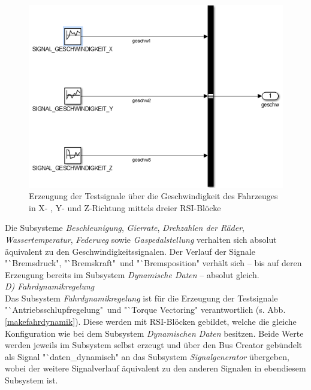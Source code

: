 \documentclass[fontsize = 12pt, paper = a4]{scrreprt}
\begin{document}
\begin{figure}[h]
\centering
\includegraphics[scale = 0.85]{makegeschwindigkeit}
\caption[Generierung der Testsignale für die Geschwindigkeit des Fahrzeuges]{Erzeugung der Testsignale über die Geschwindigkeit des Fahrzeuges in X- , Y- und Z-Richtung mittels dreier RSI-Blöcke}
\label{makegeschwindigkeit}
\end{figure}

Die Subsysteme \textit{Beschleunigung}, \textit{Gierrate}, \textit{Drehzahlen der Räder}, \textit{Wassertemperatur}, \textit{Federweg} sowie \textit{Gaspedalstellung} verhalten sich absolut äquivalent zu den Geschwindigkeitssignalen.
Der Verlauf der Signale "`Bremsdruck", "`Bremskraft"\ und "`Bremsposition" verhält sich -- bis auf deren Erzeugung bereits im Subsystem \textit{Dynamische Daten} -- absolut gleich. \\

\textit{D) Fahrdynamikregelung} \\

Das Subsystem \textit{Fahrdynamikregelung} ist für die Erzeugung der Testsignale "`Antriebsschlupfregelung"\ und "`Torque Vectoring" verantwortlich (s. Abb. \ref{makefahrdynamik}). Diese werden mit RSI-Blöcken gebildet, welche die gleiche Konfiguration wie bei dem Subsystem \textit{Dynamischen Daten} besitzen. Beide Werte werden jeweils im Subsystem selbst erzeugt und über den Bus Creator gebündelt als Signal "`daten\_dynamisch" an das Subsystem \textit{Signalgenerator} übergeben, wobei der weitere Signalverlauf äquivalent zu den anderen Signalen in ebendiesem Subsystem ist.

\newpage
\end{document}
